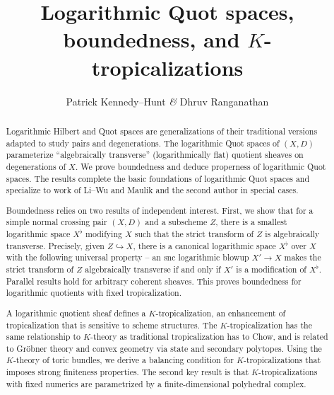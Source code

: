 \documentclass[11pt]{amsart}
\theoremstyle{definition}
\theoremstyle{definition}
\begin{document}
	\title{Logarithmic Quot spaces, boundedness, and $K$-tropicalizations}
	\author{Patrick Kennedy--Hunt {\it\&} Dhruv Ranganathan}

	\begin{abstract}
	Logarithmic Hilbert and Quot spaces are generalizations of their traditional versions adapted to study pairs and degenerations. The logarithmic Quot spaces of $(X,D)$ parameterize ``algebraically transverse'' (logarithmically flat) quotient sheaves on degenerations of $X$. We prove boundedness and deduce properness of logarithmic Quot spaces. The results complete the basic foundations of logarithmic Quot spaces and specialize to work of Li--Wu and Maulik and the second author in special cases. 

    Boundedness relies on two results of independent interest.  First, we show that for a simple normal crossing pair $(X, D)$ and a subscheme $Z$, there is a smallest logarithmic space ${X}^\flat$ modifying $X$ such that the strict transform of $Z$ is algebraically transverse. Precisely, given $Z\hookrightarrow X$, there is a canonical logarithmic space $X^\flat$ over $X$ with the following universal property -- an snc logarithmic blowup $X'\to X$ makes the strict transform of $Z$ algebraically transverse if and only if $X'$ is a modification of $X^\flat$. Parallel results hold for arbitrary coherent sheaves. This proves boundedness for logarithmic quotients with fixed tropicalization. 

    A logarithmic quotient sheaf defines a $K$-tropicalization, an enhancement of tropicalization that is sensitive to scheme  structures. The $K$-tropicalization has the same relationship to $K$-theory as traditional tropicalization has to Chow, and is related to Gr\"obner theory and convex geometry via state and secondary polytopes.
    Using the $K$-theory of toric bundles, we derive a balancing condition for $K$-tropicalizations that imposes strong finiteness properties. The second key result is that $K$-tropicalizations with fixed numerics are parametrized by a finite-dimensional polyhedral complex. 
	\end{abstract}

    \address{Patrick Kennedy-Hunt and Dhruv Ranganathan \\ Department of Pure Mathematics {\it \&} Mathematical Statistics\\
University of Cambridge, Cambridge, UK}
\end{document}
